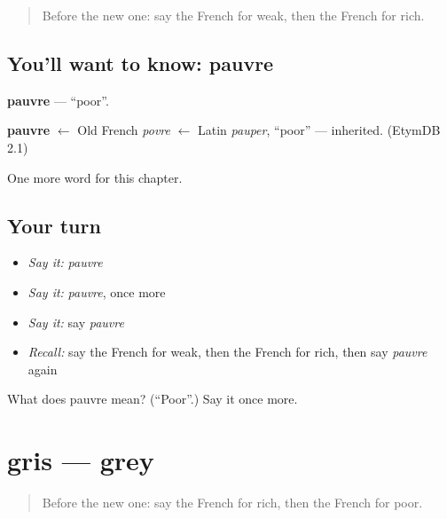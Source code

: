 \label{lesson:FR-C91-pauvre}



\begin{quote}
Before the new one: say the French for weak, then the French for rich.
\end{quote}

\subsection*{You'll want to know: pauvre}
\textbf{pauvre} — \textquotedblleft{}poor\textquotedblright{}.

\begin{cousinweb}
\textbf{pauvre} $\leftarrow$ Old French \emph{povre} $\leftarrow$ Latin \emph{pauper}, \textquotedblleft{}poor\textquotedblright{} — inherited. (EtymDB 2.1)
\end{cousinweb}

\begin{grammarlens}[title={What you've built}]
One more word for this chapter.
\end{grammarlens}

\subsection*{Your turn}
\begin{itemize}
\raggedright
  \item \emph{Say it:} \emph{pauvre}
  \item \emph{Say it:} \emph{pauvre}, once more
  \item \emph{Say it:} say \emph{pauvre}
  \item \emph{Recall:} say the French for weak, then the French for rich, then say \emph{pauvre} again
\end{itemize}

\begin{tcolorbox}[breakable,colback=teal!4,colframe=teal!35!black,title={Before you move on}]
What does pauvre mean? (\textquotedblleft{}Poor\textquotedblright{}.) Say it once more.
\end{tcolorbox}
\section[gris]{gris — grey}

\label{lesson:FR-C91-gris}



\begin{quote}
Before the new one: say the French for rich, then the French for poor.
\end{quote}

